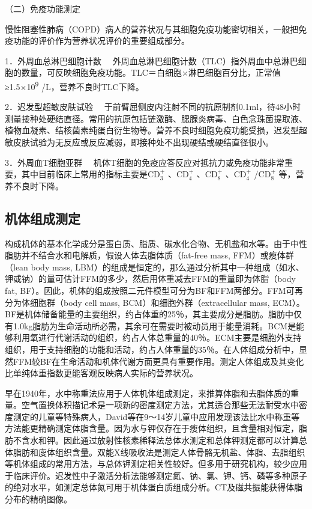 （二）免疫功能测定

慢性阻塞性肺病（COPD）病人的营养状况与其细胞免疫功能密切相关，一般把免疫功能的评价作为营养状况评价的重要组成部分。

{1．外周血总淋巴细胞计数}
　外周血总淋巴细胞计数（TLC）指外周血中总淋巴细胞的数量，可反映细胞免疫功能。TLC＝白细胞×淋巴细胞百分比，正常值≥1.5×10\textsuperscript{9}
/L，营养不良时TLC下降。

{2．迟发型超敏皮肤试验}
　于前臂屈侧皮内注射不同的抗原制剂0.1ml，待48小时测量接种处硬结直径。常用的抗原包括链激酶、腮腺炎病毒、白色念珠菌提取液、植物血凝素、结核菌素纯蛋白衍生物等。营养不良时细胞免疫功能受损，迟发型超敏皮肤试验为无反应或反应减弱，即接种处不出现硬结或硬结直径很小。

{3．外周血T细胞亚群}
　机体T细胞的免疫应答反应对抵抗力或免疫功能非常重要，其中目前临床上常用的指标主要是$\text{CD}^+_3$
、$\text{CD}^+_4$
、$\text{CD}^+_8$
、$\text{CD}^+_4$
/$\text{CD}^+_8$ 等，营养不良时下降。

\hypertarget{text00002.htmlux5cux23mllj8}{%
\subsection{机体组成测定}\label{text00002.htmlux5cux23mllj8}}

构成机体的基本化学成分是蛋白质、脂质、碳水化合物、无机盐和水等。由于中性脂肪并不结合水和电解质，假设人体去脂体质（fat-free
mass, FFM）或瘦体群（lean body mass,
LBM）的组成是恒定的，那么通过分析其中一种组成（如水、钾或钠）的量可估计FFM的多少，然后用体重减去FFM的重量即为体脂（body
fat,
BF）。因此，机体的组成按照二元件模型可分为BF和FFM两部分。FFM可再分为体细胞群（body
cell mass, BCM）和细胞外群（extracellular mass,
ECM）。BF是机体储备能量的主要组织，约占体重的25％，其主要成分是脂肪。脂肪中仅有1.0kg脂肪为生命活动所必需，其余可在需要时被动员用于能量消耗。BCM是能够利用氧进行代谢活动的组织，约占人体总重量的40％。ECM主要是细胞外支持组织，用于支持细胞的功能和活动，约占人体重量的35％。在人体组成分析中，显然FFM较BF在生命活动和机体代谢方面更具有重要作用。测定人体组成及其变化比单纯体重指数更能客观反映病人实际的营养状况。

早在1940年，水中称重法应用于人体机体组成测定，来推算体脂和去脂体质的重量。空气置换体积描记术是一项新的密度测定方法，尤其适合那些无法耐受水中密度测定的儿童等特殊病人，David等在9～14岁儿童中应用发现该法比水中称重等方法能更精确测定体脂含量。因为水与钾仅存在于瘦体组织，且含量相对恒定，脂肪不含水和钾。因此通过放射性核素稀释法总体水测定和总体钾测定都可以计算总体脂肪和廋体组织含量。双能X线吸收法是测定人体骨骼无机盐、体脂、去脂组织等机体组成的常用方法，与总体钾测定相关性较好。但多用于研究机构，较少应用于临床评价。迟发性中子激活分析法能够测定氮、钠、氯、钾、钙、磷等多种原子的绝对水平，如测定总体氮可用于机体蛋白质组成分析。CT及磁共振能获得体脂分布的精确图像。

